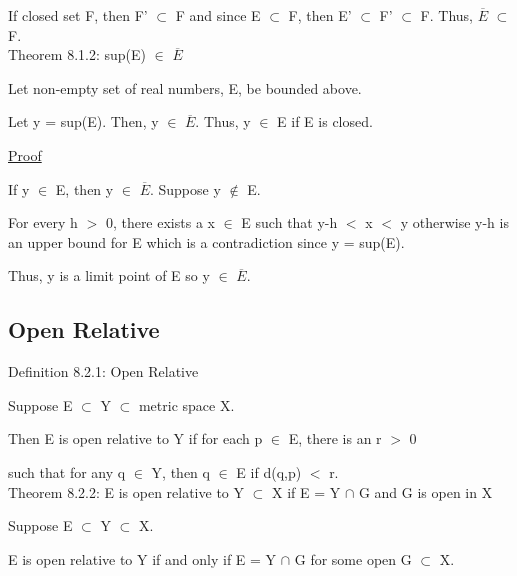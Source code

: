 	If closed set F, then F' $\subset$ F and since E $\subset$ F, then
	E' $\subset$ F' $\subset$ F.
	Thus, $\overline{E}$ $\subset$ F. \\

{ \color{red} Theorem 8.1.2: sup(E) $\in$ $\overline{E}$ }

    \begin{adjustbox}{minipage=14cm, right, vspace=0.1cm 0cm}
        Let non-empty set of real numbers, E, be bounded above.
        
        Let y = sup(E). Then, y $\in$ $\overline{E}$.
        Thus, y $\in$ E if E is closed.
    \end{adjustbox}

{ \color{magenta} \underline{Proof} } 
	
	If y $\in$ E, then y $\in$ $\overline{E}$. Suppose y $\not \in$ E.

	For every h $>$ 0, there exists a x $\in$ E such that y-h $<$ x $<$ y
	otherwise y-h is an upper bound for E which is a contradiction
	since y = sup(E).

	Thus, y is a limit point of E so y $\in$ $\overline{E}$.





\subsection{ Open Relative }

{ \color{blue} Definition 8.2.1: Open Relative }

	\begin{adjustbox}{minipage=14cm, right, vspace=0.1cm 0cm}
		Suppose E $\subset$ Y $\subset$ metric space X.

		Then E is open relative to Y if for each p $\in$ E, there is an
		r $>$ 0

		such that for any q $\in$ Y, then q $\in$ E if d(q,p) $<$ r. \\
	\end{adjustbox}

{ \color{red} Theorem 8.2.2: E is open relative to Y $\subset$ X
if E = Y $\cap$ G and G is open in X} 

	\begin{adjustbox}{minipage=14cm, right, vspace=0.1cm 0cm}
		Suppose E $\subset$ Y $\subset$ X.

		E is open relative to Y if and only if E = Y $\cap$ G
		for some open G $\subset$ X.
	\end{adjustbox}


